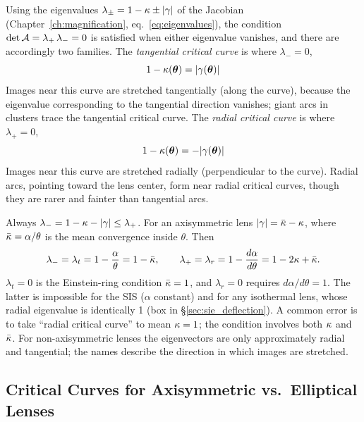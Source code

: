 Using the eigenvalues $\lambda_\pm = 1 - \kappa \pm |\gamma|$ of
the Jacobian (Chapter~\ref{ch:magnification}, eq.~\ref{eq:eigenvalues}),
the condition $\det\mathcal{A} = \lambda_+\,\lambda_- = 0$ is satisfied
when either eigenvalue vanishes, and there are accordingly two
families.  The \emph{tangential critical curve} is where
$\lambda_- = 0$,
\begin{equation}
    1 - \kappa(\boldsymbol{\theta}) = |\gamma(\boldsymbol{\theta})|
    \label{eq:tangential_crit}
\end{equation}
Images near this curve are stretched tangentially (along the curve),
because the eigenvalue corresponding to the tangential direction
vanishes; giant arcs in clusters trace the tangential critical
curve.  The \emph{radial critical curve} is where $\lambda_+ = 0$,
\begin{equation}
    1 - \kappa(\boldsymbol{\theta}) = -|\gamma(\boldsymbol{\theta})|
    \label{eq:radial_crit}
\end{equation}
Images near this curve are stretched radially (perpendicular to the
curve).  Radial arcs, pointing toward the lens center, form near
radial critical curves, though they are rarer and fainter than
tangential arcs.

\begin{annotation}
Always $\lambda_- = 1-\kappa-|\gamma| \le \lambda_+$.  For an axisymmetric
lens $|\gamma| = \bar{\kappa} - \kappa$, where $\bar{\kappa} = \alpha/\theta$
is the mean convergence inside $\theta$.  Then
\[
  \lambda_- = \lambda_t = 1 - \frac{\alpha}{\theta} = 1 - \bar{\kappa},
  \qquad
  \lambda_+ = \lambda_r = 1 - \frac{d\alpha}{d\theta} = 1 - 2\kappa + \bar{\kappa} .
\]
$\lambda_t = 0$ is the Einstein-ring condition $\bar{\kappa} = 1$, and
$\lambda_r = 0$ requires $d\alpha/d\theta = 1$.  The latter is impossible for
the SIS ($\alpha$ constant) and for any isothermal lens, whose radial
eigenvalue is identically 1 (box in \S\ref{sec:sie_deflection}).  A common
error is to take ``radial critical curve'' to mean $\kappa = 1$; the condition
involves both $\kappa$ and $\bar{\kappa}$.  For non-axisymmetric lenses the
eigenvectors are only approximately radial and tangential; the names describe
the direction in which images are stretched.
\end{annotation}


\subsection{Critical Curves for Axisymmetric vs.\ Elliptical Lenses}

